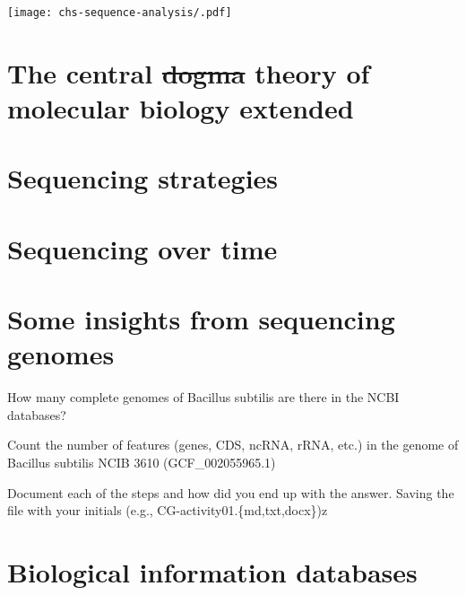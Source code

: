\documentclass[
  letterpaper,
  DIV=11,
  numbers=noendperiod,
  oneside]{scrreprt}
\begin{document}
\texttt{[image: chs-sequence-analysis/.pdf]}

\hypertarget{the-central-dogma-theory-of-molecular-biology-extended}{%
\section{\texorpdfstring{The central \sout{dogma} theory of molecular
biology
extended}{The central dogma theory of molecular biology extended}}\label{the-central-dogma-theory-of-molecular-biology-extended}}

\hypertarget{sequencing-strategies}{%
\section{Sequencing strategies}\label{sequencing-strategies}}

\hypertarget{sequencing-over-time}{%
\section{Sequencing over time}\label{sequencing-over-time}}

\hypertarget{some-insights-from-sequencing-genomes}{%
\section{Some insights from sequencing
genomes}\label{some-insights-from-sequencing-genomes}}

\begin{tcolorbox}[enhanced jigsaw, opacityback=0, leftrule=.75mm, breakable, titlerule=0mm, toprule=.15mm, rightrule=.15mm, title=\textcolor{quarto-callout-warning-color}{\faExclamationTriangle}\hspace{0.5em}{Challenge}, colback=white, opacitybacktitle=0.6, toptitle=1mm, bottomtitle=1mm, colframe=quarto-callout-warning-color-frame, colbacktitle=quarto-callout-warning-color!10!white, arc=.35mm, coltitle=black, bottomrule=.15mm, left=2mm]
How many complete genomes of Bacillus subtilis are there in the NCBI
databases?

Count the number of features (genes, CDS, ncRNA, rRNA, etc.) in the
genome of Bacillus subtilis NCIB 3610 (GCF\_002055965.1)

Document each of the steps and how did you end up with the answer.
Saving the file with your initials (e.g.,
CG-activity01.\{md,txt,docx\})z
\end{tcolorbox}

\hypertarget{biological-information-databases}{%
\section{Biological information
databases}\label{biological-information-databases}}
\end{document}
